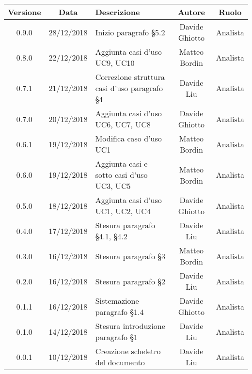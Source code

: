 \begin{table}[!htbp] %
            \centering
            \renewcommand{\arraystretch}{2}
            \begin{tabular}{|c|c|p{5cm}|c|c|} %
                \rowcolor{orange!50} %
        		\hline
        		\textbf{Versione} & \textbf{Data} & \textbf{Descrizione} & \textbf{Autore} & \textbf{Ruolo} \\
                \hline
                0.9.0 & 28/12/2018 & Inizio paragrafo §5.2 & Davide Ghiotto & Analista \\
                \hline
                0.8.0 & 22/12/2018 & Aggiunta casi d’uso UC9, UC10 & Matteo Bordin & Analista \\
                \hline
                0.7.1 & 21/12/2018 & Correzione struttura casi d’uso paragrafo §4 & Davide Liu & Analista \\
                \hline
                0.7.0 & 20/12/2018 & Aggiunta casi d’uso UC6, UC7, UC8 & Davide Ghiotto & Analista \\
                \hline
                0.6.1 & 19/12/2018 & Modifica caso d’uso UC1 & Matteo Bordin & Analista \\
                \hline
                0.6.0 & 19/12/2018 & Aggiunta casi e sotto casi d’uso UC3, UC5 & Matteo Bordin & Analista \\
                \hline
                0.5.0 & 18/12/2018 & Aggiunta casi d’uso UC1, UC2, UC4 & Davide Ghiotto & Analista \\
                \hline
                0.4.0 & 17/12/2018 & Stesura paragrafo §4.1, §4.2 & Davide Liu & Analista \\
                \hline
                0.3.0 & 16/12/2018 & Stesura paragrafo §3 & Matteo Bordin & Analista \\
                \hline
                0.2.0 & 16/12/2018 & Stesura paragrafo §2 & Davide Liu & Analista \\
                \hline
                0.1.1 & 16/12/2018 & Sistemazione  paragrafo §1.4 & Davide Ghiotto & Analista \\
                \hline 
                0.1.0 & 14/12/2018 & Stesura introduzione paragrafo §1 & Davide Liu & Analista \\
                \hline
                0.0.1 & 10/12/2018 & Creazione scheletro del documento & Davide Liu & Analista \\
                \hline
        \end{tabular}
\end{table}
